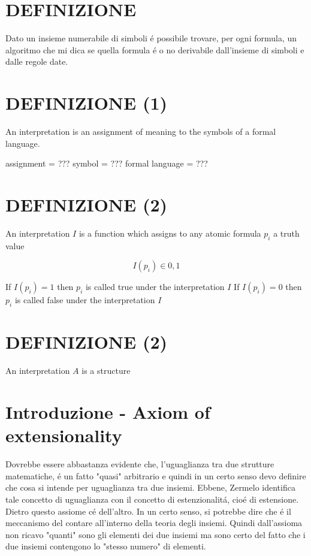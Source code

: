 \section{DEFINIZIONE}
Dato un insieme numerabile di simboli \'{e} possibile trovare, per ogni formula, un algoritmo che mi dica se quella formula \'{e} o no derivabile dall'insieme di simboli e dalle regole date.


\section{DEFINIZIONE (1)}
An interpretation is an assignment of meaning to the symbols of a formal language.  

assignment = ???  
symbol = ???  
formal language = ???

\section{DEFINIZIONE (2)}
An interpretation $I$ is a function which assigns to any atomic formula $p_i$ a truth value

\[
I(p_i) \in {0,1}
\]

If $I(p_i)=1$ then $p_i$ is called true under the interpretation $I$  
If $I(p_i)=0$ then $p_i$ is called false under the interpretation $I$

\section{DEFINIZIONE (2)}
An interpretation $A$ is a structure





\section{Introduzione - Axiom of extensionality}
Dovrebbe essere abbastanza evidente che, l'uguaglianza tra due strutture matematiche, \'{e} un fatto "quasi" arbitrario e quindi in un certo senso devo definire che cosa si intende
per uguaglianza tra due insiemi. Ebbene, Zermelo identifica tale concetto di uguaglianza con il concetto di estenzionalit\'{a}, cio\'{e} di estensione. Dietro questo assiome
c\'{e} dell'altro. In un certo senso, si potrebbe dire che \'{e} il meccanismo del contare all'interno della teoria degli insiemi. Quindi dall'assioma non ricavo "quanti" sono
gli elementi dei due insiemi ma sono certo del fatto che i due insiemi contengono lo "stesso numero" di elementi.

